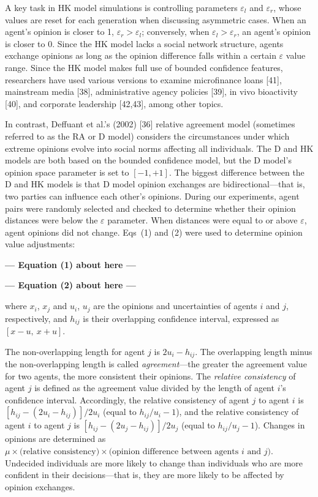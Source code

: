 \documentclass[10pt,letterpaper]{article}
\begin{document}
A key task in HK model simulations is controlling parameters $\varepsilon_{l}$ and $\varepsilon_{r}$, whose values are reset for each generation when discussing asymmetric cases. When an agent's opinion is closer to 1, $\varepsilon_{r} > \varepsilon_{l}$; conversely, when $\varepsilon_{l} > \varepsilon_{r}$, an agent's opinion is closer to 0. Since the HK model lacks a social network structure, agents exchange opinions as long as the opinion difference falls within a certain $\varepsilon$ value range. Since the HK model makes full use of bounded confidence features, researchers have used various versions to examine microfinance loans [41], mainstream media [38], administrative agency policies [39], in vivo bioactivity [40], and corporate leadership [42,43], among other topics.

In contrast, Deffuant et al.'s (2002) [36] relative agreement model (sometimes referred to as the RA or D model) considers the circumstances under which extreme opinions evolve into social norms affecting all individuals. The D and HK models are both based on the bounded confidence model, but the D model's opinion space parameter is set to $[-1, +1]$. The biggest difference between the D and HK models is that D model opinion exchanges are bidirectional---that is, two parties can influence each other's opinions. During our experiments, agent pairs were randomly selected and checked to determine whether their opinion distances were below the $\varepsilon$ parameter. When distances were equal to or above $\varepsilon$, agent opinions did not change. Eqs~(1) and (2) were used to determine opinion value adjustments:


\begin{center}\textbf{--- Equation (1) about here ---}\end{center}


\begin{center}\textbf{--- Equation (2) about here ---}\end{center}


\noindent where $x_{i}$, $x_{j}$ and $u_{i}$, $u_{j}$ are the opinions and uncertainties of agents $i$ and $j$, respectively, and $h_{ij}$ is their overlapping confidence interval, expressed as $[x - u,\ x + u]$.

The non-overlapping length for agent $j$ is $2u_{i} - h_{ij}$. The overlapping length minus the non-overlapping length is called \textit{agreement}---the greater the agreement value for two agents, the more consistent their opinions. The \textit{relative consistency} of agent $j$ is defined as the agreement value divided by the length of agent $i$'s confidence interval. Accordingly, the relative consistency of agent $j$ to agent $i$ is $[h_{ij} - (2u_{i} - h_{ij})]/2u_{i}$ (equal to $h_{ij}/u_{i} - 1$), and the relative consistency of agent $i$ to agent $j$ is $[h_{ij} - (2u_{j} - h_{ij})]/2u_{j}$ (equal to $h_{ij}/u_{j} - 1$). Changes in opinions are determined as $\mu \times \text{(relative consistency)} \times \text{(opinion difference between agents } i \text{ and } j\text{)}$. Undecided individuals are more likely to change than individuals who are more confident in their decisions---that is, they are more likely to be affected by opinion exchanges.
\end{document}
